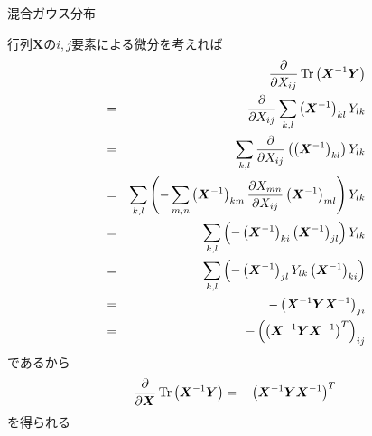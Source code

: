 \documentclass[dvipdfmx,notheorems,t]{beamer}
\begin{document}
\begin{frame}{混合ガウス分布}
\begin{itemize}
\begin{itemize}
		行列$\bm{X}$の$i, j$要素による微分を考えれば
		\begin{eqnarray}
			&& \frac{\partial}{\partial X_{ij}} \operatorname{Tr} \left( \bm{X}^{-1} \bm{Y} \right) \nonumber \\
			&=& \frac{\partial}{\partial X_{ij}} \sum_{k, l} \left( \bm{X}^{-1} \right)_{kl} Y_{lk} \nonumber \\
			&=& \sum_{k, l} \frac{\partial}{\partial X_{ij}} \left( \left( \bm{X}^{-1} \right)_{kl} \right) Y_{lk} \nonumber \\
			&=& \sum_{k, l} \left( - \sum_{m, n} \left( \bm{X}^{-1} \right)_{km} \frac{\partial X_{mn}}{\partial X_{ij}} \left( \bm{X}^{-1} \right)_{ml} \right) Y_{lk} \nonumber \\
			&=& \sum_{k, l} \left( - \left( \bm{X}^{-1} \right)_{ki} \left( \bm{X}^{-1} \right)_{jl} \right) Y_{lk} \nonumber \\
			&=& \sum_{k, l} \left( - \left( \bm{X}^{-1} \right)_{jl} Y_{lk} \left( \bm{X}^{-1} \right)_{ki} \right) \nonumber \\
			&=& - \left( \bm{X}^{-1} \bm{Y} \bm{X}^{-1} \right)_{ji} \nonumber \\
			&=& - \left( \left( \bm{X}^{-1} \bm{Y} \bm{X}^{-1} \right)^T \right)_{ij}
		\end{eqnarray}
		であるから
		\begin{equation}
			\frac{\partial}{\partial \bm{X}} \operatorname{Tr} \left( \bm{X}^{-1} \bm{Y} \right) = - \left( \bm{X}^{-1} \bm{Y} \bm{X}^{-1} \right)^T
		\end{equation}
		を得られる
	\end{itemize}
\end{itemize}

\end{frame}
\end{document}
